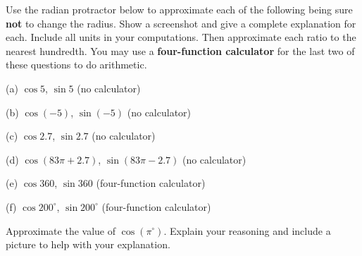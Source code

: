 \documentclass{ximera}
\begin{document}
\begin{exploration}\label{Exp1:CF}
Use the radian protractor below to approximate each of the following being sure {\bf not} to change the radius. Show a screenshot and give a complete explanation for each. Include all units in your computations. Then approximate each ratio to the nearest hundredth. You may use a {\bf four-function calculator} for the last two of these questions to do arithmetic.

(a) $\cos 5$, $\sin 5$  (no calculator)

(b) $\cos (-5)$,  $\sin (-5)$ (no calculator)

(c) $\cos 2.7$, $\sin 2.7$ (no calculator)

(d) $\cos (83\pi + 2.7)$, $\sin (83\pi-2.7)$ (no calculator)

(e) $\cos 360$, $\sin 360$ (four-function calculator)

(f) $\cos 200^\circ$, $\sin 200^\circ$ (four-function calculator)

 
\begin{onlineOnly}
    \begin{center}
\end{center}
\end{onlineOnly}
\end{exploration}

\begin{question} \label{Q2:Cosine}
Approximate the value of $\cos (\pi^\circ)$. Explain your reasoning and include a picture to help with your explanation.
\end{question}
\end{document}
